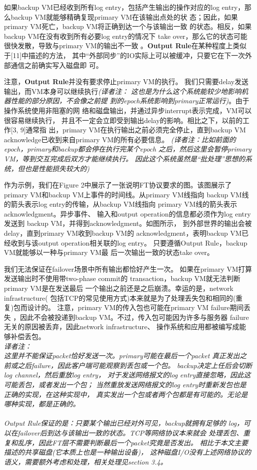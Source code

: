 如果backup VM已经收到所有log entry，包括产生输出的操作对应的log %
entry，那么backup VM就能够精确复现primary VM在该输出点处的状%
态；因此，如果primary VM死亡，backup VM将正确到达一个与该输出一致%
的状态。相反，如果backup VM在没有收到所有必要log entry的情况下%
take over，那么它的状态可能很快发散，导致与primary VM的输出不一致%
。\textbf{Output Rule}在某种程度上类似于[11]中描述的方法，%
其中“外部同步”的IO实际上可以被缓冲，只要它在下一次外部通信之前确实写入磁盘即%
可。%

注意，\textbf{Output Rule}并没有要求停止primary VM的执行。%
我们只需要delay发送输出，而VM本身可以继续执行\emph{(译者注：
这也是为什么这个系统能较少地影响机器性能的部分原因，不会像之前提%
到的epoch系统影响到primary正常运行)}。由于操作系统使用非阻塞的网%
络和磁盘输出，并通过异步interrupt表示完成，VM可以很容易继续执行，%
并且不一定会立即受到输出delay的影响。相比之下，以前的工作[3, 9]通常指%
出，primary VM在执行输出之前必须完全停止，直到backup VM %
acknowledge已收到来自primary VM的所有必要信息。\emph{
(译者注：比如前面的epoch，primary和backup都会停在执行完某个epoch
之后，然后这里会暂停primary VM，等到交互完成后双方才能继续执行。
因此这个系统虽然是“批处理”思想的系统，但也是性能损失较大的)}%

作为示例，我们在Figure 2中展示了一张说明FT协议要求的图。该图展示了%
primary VM和backup VM上事件的时间线。从primary VM线指向%
backup VM线的箭头表示log entry的传输，从backup VM线指向%
primary VM线的箭头表示acknowledgment。异步事件、%
输入和output operation的信息都必须作为log entry发送到%
backup VM，并得到acknowledgment。如图所示，%
到外部世界的输出会被delay，直到primary VM收到backup VM的%
acknowledgment，表明backup VM已经收到与该output %
operation相关联的log entry。%
只要遵循Output Rule，backup VM就能够以一种与primary VM最%
后一次输出一致的状态take over。%

我们无法保证在failover场景中所有输出都恰好产生一次。%
如果在primary VM打算发送输出时不使用带two-phase commit的%
transaction，backup VM就无法判断primary VM是在发送最后%
一个输出之前还是之后崩溃。幸运的是，network infrastructure(%
包括TCP的常见使用方式)本来就是为了处理丢失包和相同的(重复)包而设计的。%
注意，primary VM的传入包也可能在primary VM failure期间丢失%
，因此不会被投递到backup VM。不过，传入包可能因为许多与服务器%
failure无关的原因被丢弃，因此network infrastructure、%
操作系统和应用都被编写成能够补偿丢包。%
\\\emph{译者注：
\\这里并不能保证packet恰好发送一次。primary可能在最后一个packet%
真正发出之前或之后failure，因此客户端可能观察到丢包或一个包。%
backup决定上任后会切断log channel，然后重放log entry，%
对于发送网络报文的log entry直接忽略，因此这可能丢包，或者发出一个包；
当然重放发送网络报文的log entry时重新发包也是正确的实现，在这种实现中，%
真实发出一个包或者两个包都是有可能的。无论是哪种实现，都是正确的。%
\\\\Output Rule保证的是：只要某个输出已经对外可见，backup就拥有足够的%
log，可以在failover后到达与该输出一致的状态。TCP等网络协议本来就会%
处理丢包、重复和乱序，因此FT层不需要判断最后一个packet究竟是否发出。%
相比于本文主要描述的共享磁盘(它本质上也是一种输出设备)，%
这种磁盘I/O没有上述网络协议的语义，需要额外考虑和处理，相关处理见section 3.4。}%

